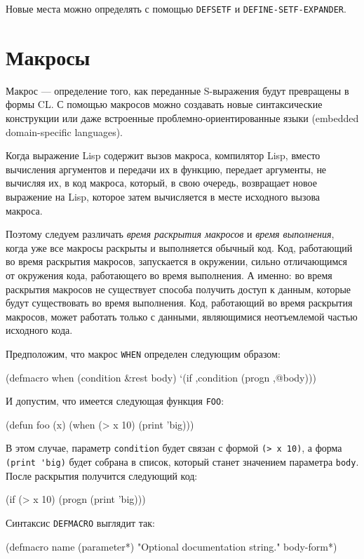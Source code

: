 Новые места можно определять с помощью \lstinline{DEFSETF} и \lstinline{DEFINE-SETF-EXPANDER}.

\section{Макросы}
Макрос — определение того, как переданные S-выражения будут превращены в формы CL. С помощью макросов можно создавать новые синтаксические конструкции или даже встроенные проблемно-ориентированные языки (embedded domain-specific languages).

Когда выражение Lisp содержит вызов макроса, компилятор Lisp, вместо вычисления аргументов и передачи их в функцию, передает аргументы, не вычисляя их, в код макроса, который, в свою очередь, возвращает новое выражение на Lisp, которое затем вычисляется в месте исходного вызова макроса.

Поэтому следуем различать \emph{время раскрытия макросов} и \emph{время выполнения}, когда уже все макросы раскрыты и выполняется обычный код. Код, работающий во время раскрытия макросов, запускается в окружении, сильно отличающимся от окружения кода, работающего во время выполнения. А именно: во время раскрытия макросов не существует способа получить доступ к данным, которые будут существовать во время выполнения. Код, работающий во время раскрытия макросов, может работать только с данными, являющимися неотъемлемой частью исходного кода.

Предположим, что макрос \lstinline{WHEN} определен следующим образом:
\begin{cllst}{}{}
(defmacro when (condition &rest body)
  `(if ,condition (progn ,@body)))
\end{cllst}

И допустим, что имеется следующая функция \lstinline{FOO}:
\begin{cllst}{}{}
(defun foo (x)
  (when (> x 10) (print 'big)))
\end{cllst}

В этом случае, параметр \lstinline{condition} будет связан с формой \lstinline{(> x 10)}, а форма \lstinline{(print 'big)} будет собрана в список, который станет значением параметра \lstinline{body}. После раскрытия получится следующий код:
\begin{cllst}{}{}
(if (> x 10) (progn (print 'big)))
\end{cllst}

Синтаксис \lstinline{DEFMACRO} выглядит так:
\begin{cllst}{}{}
(defmacro name (parameter*)
  "Optional documentation string."
  body-form*)
\end{cllst}

